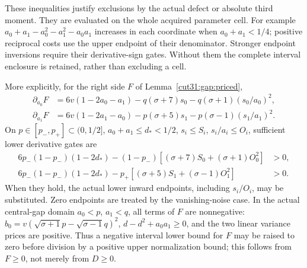 \documentclass[11pt,a4paper]{article}
\numberwithin{equation}{section}
\theoremstyle{definition}
\theoremstyle{remark}
\begin{document}
These inequalities justify exclusions by the actual defect or
absolute third moment. They are evaluated on the whole acquired
parameter cell. For example
\(a_0+a_1-a_0^2-a_1^2-a_0a_1\) increases in each coordinate
when \(a_0+a_1<1/4\); positive reciprocal costs use the upper
endpoint of their denominator. Stronger endpoint inversions require
their derivative-sign gates. Without them the complete interval
enclosure is retained, rather than excluding a cell.

More explicitly, for the right side \(F\) of
Lemma~\ref{cut31:gap:priced},
\[
 \begin{aligned}
 \partial_{a_0}F&=6v(1-2a_0-a_1)-q(\sigma+7)s_0
                         -q(\sigma+1)(s_0/a_0)^2,\\
 \partial_{a_1}F&=6v(1-2a_1-a_0)-p(\sigma+5)s_1
                         -p(\sigma-1)(s_1/a_1)^2.
 \end{aligned}
\]
On \(p\in[p_-,p_+]\subset(0,1/2]\),
\(a_0+a_1\le d_*<1/2\),
\(s_i\le S_i\), \(s_i/a_i\le O_i\), sufficient lower
derivative gates are
\[
 \begin{aligned}
 6p_-(1-p_-)(1-2d_*)-(1-p_-)
               [ (\sigma+7)S_0+(\sigma+1)O_0^2 ]&>0,\\
 6p_-(1-p_-)(1-2d_*)-p_+
               [ (\sigma+5)S_1+(\sigma-1)O_1^2 ]&>0.
 \end{aligned}
\]
When they hold, the actual lower inward endpoints, including
\(s_i/O_i\), may be substituted. Zero endpoints are treated
by the vanishing-noise case. In the actual central-gap domain
\(a_0<p\), \(a_1<q\), all terms of \(F\) are nonnegative:
\(b_0=v(\sqrt{\sigma+1}p-\sqrt{\sigma-1}q)^2\),
\(d-d^2+a_0a_1\ge0\), and the two linear variance prices
are positive. Thus a negative interval lower bound for \(F\)
may be raised to zero before division by a positive upper
normalization bound; this follows from \(F\ge0\), not merely
from \(D\ge0\).
\end{document}
